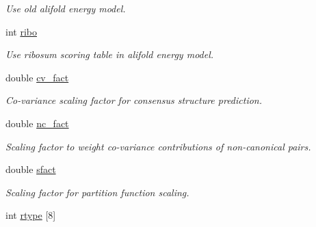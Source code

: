 \begin{DoxyCompactItemize}
\begin{DoxyCompactList}\small\item\em Use old alifold energy model. \end{DoxyCompactList}\item 
int \hyperlink{structvrna__md__s_a3df2ae4bd9c133ef8ab92a53b1d035ec}{ribo}\hypertarget{structvrna__md__s_a3df2ae4bd9c133ef8ab92a53b1d035ec}{}\label{structvrna__md__s_a3df2ae4bd9c133ef8ab92a53b1d035ec}

\begin{DoxyCompactList}\small\item\em Use ribosum scoring table in alifold energy model. \end{DoxyCompactList}\item 
double \hyperlink{structvrna__md__s_a62ebefb9d0643e5c4c8a2ec84a105ce6}{cv\+\_\+fact}\hypertarget{structvrna__md__s_a62ebefb9d0643e5c4c8a2ec84a105ce6}{}\label{structvrna__md__s_a62ebefb9d0643e5c4c8a2ec84a105ce6}

\begin{DoxyCompactList}\small\item\em Co-\/variance scaling factor for consensus structure prediction. \end{DoxyCompactList}\item 
double \hyperlink{structvrna__md__s_abcf568e6124bfcb2f847ff4eb0dfded6}{nc\+\_\+fact}\hypertarget{structvrna__md__s_abcf568e6124bfcb2f847ff4eb0dfded6}{}\label{structvrna__md__s_abcf568e6124bfcb2f847ff4eb0dfded6}

\begin{DoxyCompactList}\small\item\em Scaling factor to weight co-\/variance contributions of non-\/canonical pairs. \end{DoxyCompactList}\item 
double \hyperlink{structvrna__md__s_ab6f4cabaa9b4726b13592486d5bc21c7}{sfact}\hypertarget{structvrna__md__s_ab6f4cabaa9b4726b13592486d5bc21c7}{}\label{structvrna__md__s_ab6f4cabaa9b4726b13592486d5bc21c7}

\begin{DoxyCompactList}\small\item\em Scaling factor for partition function scaling. \end{DoxyCompactList}\item 
int \hyperlink{structvrna__md__s_ad082d0fea31e002b90cdfe5e6382f8b0}{rtype} \mbox{[}8\mbox{]}\hypertarget{structvrna__md__s_ad082d0fea31e002b90cdfe5e6382f8b0}{}\label{structvrna__md__s_ad082d0fea31e002b90cdfe5e6382f8b0}


\end{DoxyCompactItemize}
